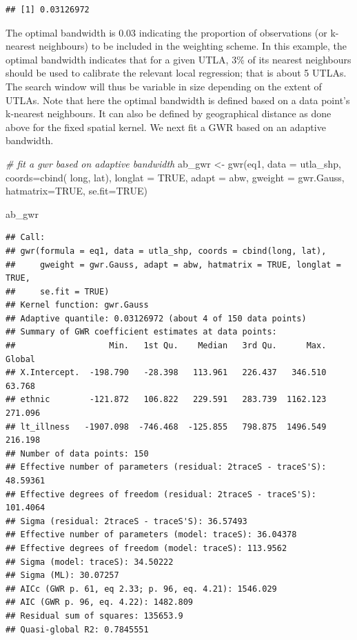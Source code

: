 \documentclass[
]{book}
\newenvironment{Shaded}{\begin{snugshade}}{\end{snugshade}}
\newcommand{\AttributeTok}[1]{\textcolor[rgb]{0.77,0.63,0.00}{#1}}
\newcommand{\CommentTok}[1]{\textcolor[rgb]{0.56,0.35,0.01}{\textit{#1}}}
\newcommand{\ConstantTok}[1]{\textcolor[rgb]{0.00,0.00,0.00}{#1}}
\newcommand{\FunctionTok}[1]{\textcolor[rgb]{0.00,0.00,0.00}{#1}}
\newcommand{\NormalTok}[1]{#1}
\newcommand{\OtherTok}[1]{\textcolor[rgb]{0.56,0.35,0.01}{#1}}
\begin{document}
\begin{verbatim}
## [1] 0.03126972
\end{verbatim}

The optimal bandwidth is 0.03 indicating the proportion of observations (or k-nearest neighbours) to be included in the weighting scheme. In this example, the optimal bandwidth indicates that for a given UTLA, 3\% of its nearest neighbours should be used to calibrate the relevant local regression; that is about 5 UTLAs. The search window will thus be variable in size depending on the extent of UTLAs. Note that here the optimal bandwidth is defined based on a data point's k-nearest neighbours. It can also be defined by geographical distance as done above for the fixed spatial kernel. We next fit a GWR based on an adaptive bandwidth.

\begin{Shaded}
\begin{Highlighting}[]
\CommentTok{\# fit a gwr based on adaptive bandwidth}
\NormalTok{ab\_gwr }\OtherTok{\textless{}{-}} \FunctionTok{gwr}\NormalTok{(eq1, }
            \AttributeTok{data =}\NormalTok{ utla\_shp,}
            \AttributeTok{coords=}\FunctionTok{cbind}\NormalTok{( long, lat),}
            \AttributeTok{longlat =} \ConstantTok{TRUE}\NormalTok{,}
            \AttributeTok{adapt =}\NormalTok{ abw, }
            \AttributeTok{gweight =}\NormalTok{ gwr.Gauss,}
            \AttributeTok{hatmatrix=}\ConstantTok{TRUE}\NormalTok{, }
            \AttributeTok{se.fit=}\ConstantTok{TRUE}\NormalTok{)}

\NormalTok{ab\_gwr}
\end{Highlighting}
\end{Shaded}

\begin{verbatim}
## Call:
## gwr(formula = eq1, data = utla_shp, coords = cbind(long, lat), 
##     gweight = gwr.Gauss, adapt = abw, hatmatrix = TRUE, longlat = TRUE, 
##     se.fit = TRUE)
## Kernel function: gwr.Gauss 
## Adaptive quantile: 0.03126972 (about 4 of 150 data points)
## Summary of GWR coefficient estimates at data points:
##                   Min.   1st Qu.    Median   3rd Qu.      Max.  Global
## X.Intercept.  -198.790   -28.398   113.961   226.437   346.510  63.768
## ethnic        -121.872   106.822   229.591   283.739  1162.123 271.096
## lt_illness   -1907.098  -746.468  -125.855   798.875  1496.549 216.198
## Number of data points: 150 
## Effective number of parameters (residual: 2traceS - traceS'S): 48.59361 
## Effective degrees of freedom (residual: 2traceS - traceS'S): 101.4064 
## Sigma (residual: 2traceS - traceS'S): 36.57493 
## Effective number of parameters (model: traceS): 36.04378 
## Effective degrees of freedom (model: traceS): 113.9562 
## Sigma (model: traceS): 34.50222 
## Sigma (ML): 30.07257 
## AICc (GWR p. 61, eq 2.33; p. 96, eq. 4.21): 1546.029 
## AIC (GWR p. 96, eq. 4.22): 1482.809 
## Residual sum of squares: 135653.9 
## Quasi-global R2: 0.7845551
\end{verbatim}
\end{document}
